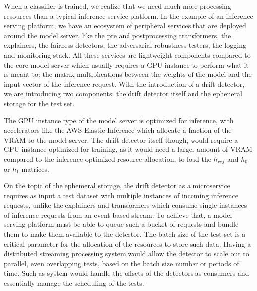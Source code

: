 \documentclass[12pt]{report}
\begin{document}



When a classifier is trained, we realize that we need much more processing resources than a typical inference service platform.
In the example of an inference serving platform, we have an ecosystem of peripheral services that are deployed around the model server, like the pre and postprocessing transformers, the explainers, the fairness detectors, the adversarial robustness testers, the logging and monitoring stack.
All these services are lightweight components compared to the core model server which usually requires a GPU instance to perform what it is meant to: the matrix multiplications between the weights of the model and the input vector of the inference request.
With the introduction of a drift detector, we are introducing two components: the drift detector itself and the epheneral storage for the test set.

The GPU instance type of the model server is optimized for inference, with accelerators like the AWS Elastic Inference which allocate a fraction of the VRAM to the model server.
The drift detector itself though, would require a GPU instance optimized for training, as it would need a larger amount of VRAM compared to the inference optimized resource allocation, to load the \(h_{ref}\) and \(h_0\) or \(h_1\) matrices.

On the topic of the ephemeral storage, the drift detector as a microservice requires as input a test dataset with multiple instances of incoming inference requests, unlike the explainers and transformers which consume single instances of inference requests from an event-based stream.
To achieve that, a model serving platform must be able to queue such a bucket of requests and bundle them to make them available to the detector.
The batch size of the test set is a critical parameter for the allocation of the resources to store such data.
Having a distributed streaming processing system would allow the detector to scale out to parallel, even overlapping tests, based on the batch size number or periods of time.
Such as system would handle the offsets of the detectors as consumers and essentially manage the scheduling of the tests.
\end{document}
